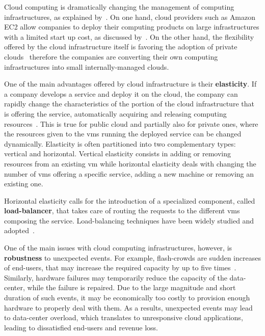 Cloud computing is dramatically changing the management of computing
infrastructures, as explained by~\cite{WPonMckinsey13}. On one hand,
cloud providers such as Amazon EC2 allow companies to deploy their
computing products on large infrastructures with a limited start up
cost, as discussed by~\cite{Buyya09:FGCS}. On the other hand, the
flexibility offered by the cloud infrastructure itself is favoring the
adoption of private clouds~\cite{Gulati11:HotCloud} therefore the companies are converting their own computing infrastructures into small internally-managed clouds.

One of the main advantages offered by cloud infrastructure is their
{\bf elasticity}. If a company develops a service and deploy it on the
cloud, the company can rapidly change the characteristics of the
portion of the cloud infrastructure that is offering the service,
automatically acquiring and releasing computing
resources~\cite{Herbst13:ICAC}. This is true for public cloud and
partially also for private ones, where the resources given to the
\acp{vm} running the deployed service can be changed dynamically.
Elasticity is often partitioned into two complementary types: vertical
and horizontal. Vertical elasticity consists in adding or removing
resources from an existing \ac{vm} while horizontal elasticity deals
with changing the number of \acp{vm} offering a specific service,
adding a new machine or removing an existing one.

Horizontal elasticity calls for the introduction of a specialized
component, called {\bf load-balancer}, that takes care of routing the
requests to the different \acp{vm} composing the
service. Load-balancing techniques have been widely studied and
adopted~\cite{Barroso09,Lu11:PerfEval,Lin12:IGCC}.

One of the main issues with cloud computing infrastructures, however,
is {\bf robustness} to unexpected events. For example, flash-crowds
are sudden increases of end-users, that may increase the required
capacity by up to five times~\cite{Bodik10:SoCC}. Similarly, hardware
failures may temporarily reduce the capacity of the data-center, while
the failure is repaired. Due to the large magnitude and short duration
of such events, it may be economically too costly to provision enough
hardware to properly deal with them. As a results, unexpected events
may lead to data-center overload, which translates to unresponsive
cloud applications, leading to dissatisfied end-users and revenue
loss.

